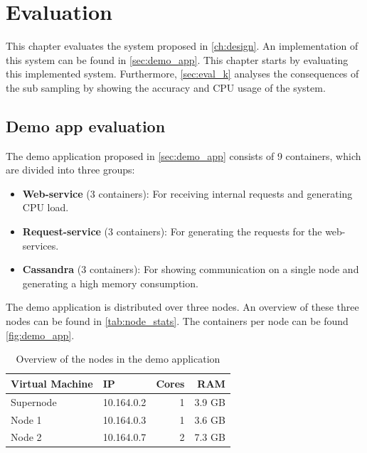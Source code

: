 \chapter{Evaluation}\label{ch:evaluation}
This chapter evaluates the system proposed in \autoref{ch:design}. An implementation of this system can be found in \autoref{sec:demo_app}.  This chapter starts by evaluating this implemented system. Furthermore, \autoref{sec:eval_k} analyses the consequences of the sub sampling by showing the accuracy and CPU usage of the system.

\section{Demo app evaluation} \label{sec:demo_eval}
The demo application proposed in \autoref{sec:demo_app} consists of 9 containers, which are divided into three groups:
\begin{itemize}
    \item \textbf{Web-service} (3 containers): For receiving internal requests and generating CPU load.
    \item \textbf{Request-service} (3 containers): For generating the requests for the web-services.
    \item \textbf{Cassandra} (3 containers): For showing communication on a single node and generating a high memory consumption.
\end{itemize}

\noindent
The demo application is distributed over three nodes. An overview of these three nodes can be found in \autoref{tab:node_stats}. The containers per node can be found \autoref{fig:demo_app}.

\begin{table}
    \centering
    \begin{tabular}{l|lrr}
        Virtual Machine &IP & Cores & RAM \\ \hline
        Supernode & 10.164.0.2 & 1 & 3.9 GB \\
        Node 1 & 10.164.0.3 & 1 & 3.6 GB \\
        Node 2 & 10.164.0.7 & 2 & 7.3 GB \\
    \end{tabular}
    \caption{Overview of the nodes in the demo application}
    \label{tab:node_stats}
\end{table}


